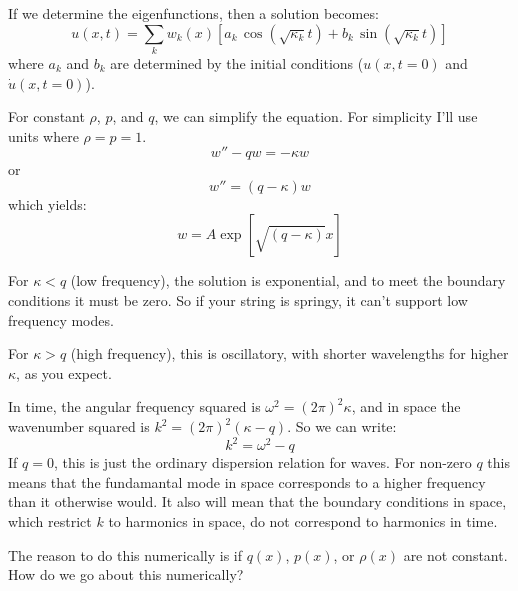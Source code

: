 If we determine the eigenfunctions, then a solution becomes:
\begin{equation}
u(x,t) = \sum_{k} w_k(x) \left[ a_k\, \cos(\sqrt{\kappa_k} t) + b_k\,
  \sin(\sqrt{\kappa_k} t) \right]
\end{equation}
where $a_k$ and $b_k$ are determined by the initial conditions
($u(x, t=0)$ and $\dot{u}(x, t=0)$).

For constant $\rho$, $p$, and $q$, we can simplify the equation. For
simplicity I'll use units where $\rho = p =1$.
\begin{equation}
w'' - q w = - \kappa w
\end{equation}
or 
\begin{equation}
w'' = (q - \kappa) w
\end{equation}
which yields:
\begin{equation}
w = A \exp\left[\sqrt{(q- \kappa)} x\right]
\end{equation}


\begin{answer}
For $\kappa < q$ (low frequency), the solution is exponential, and to
meet the boundary conditions it must be zero. So if your string is
springy, it can't support low frequency modes.

For $\kappa > q$ (high frequency), this is oscillatory, with shorter
wavelengths for higher $\kappa$, as you expect.
\end{answer}


\begin{answer}
In time, the angular frequency squared is $\omega^2 =
(2\pi)^2 \kappa$, and in space the wavenumber squared is $k^2 =
(2\pi)^2 (\kappa - q)$. So we can write:
\begin{equation}
k^2 = \omega^2 - q
\end{equation}
If $q=0$, this is just the ordinary dispersion relation for waves. For
non-zero $q$ this means that the fundamantal mode in space corresponds
to a higher frequency than it otherwise would. It also will mean that
the boundary conditions in space, which restrict $k$ to harmonics in
space, do not correspond to harmonics in time.
\end{answer}

The reason to do this numerically is if $q(x)$, $p(x)$, or $\rho(x)$
are not constant. How do we go about this numerically?

